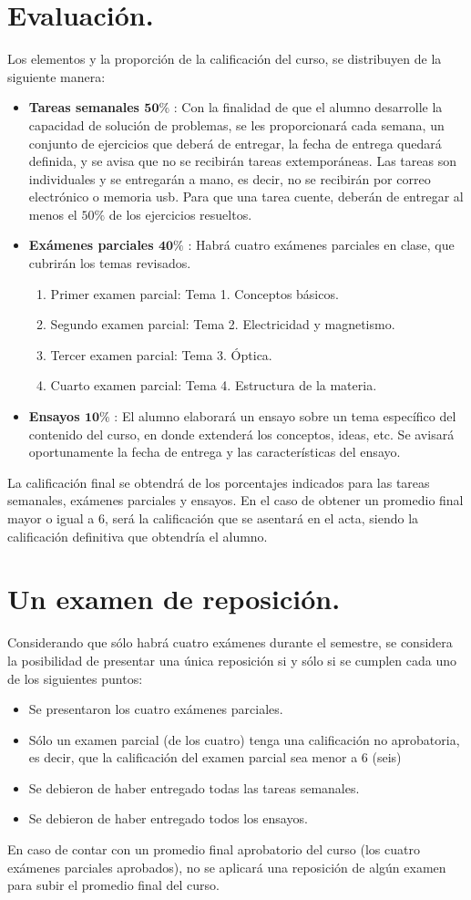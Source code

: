 \documentclass[12pt]{article}
\begin{document}
\section{Evaluación.}
Los elementos y la proporción de la calificación del curso, se distribuyen de la siguiente manera:
\begin{itemize}
\item \textbf{Tareas semanales $\mathbf{50\%}$} : Con la finalidad de que el alumno desarrolle la capacidad de solución de problemas, se les proporcionará cada semana, un conjunto de ejercicios que deberá de entregar, la fecha de entrega quedará definida, y se avisa que no se recibirán tareas extemporáneas. Las tareas son individuales y se entregarán a mano, es decir, no se recibirán por correo electrónico o memoria usb. Para que una tarea cuente, deberán de entregar al menos el $50\%$ de los ejercicios resueltos. 
\item \textbf{Exámenes parciales $\mathbf{40\%}$} : Habrá cuatro exámenes parciales en clase, que cubrirán los temas revisados.
\begin{enumerate}
\item Primer examen parcial: Tema 1. Conceptos básicos.
\item Segundo examen parcial: Tema 2. Electricidad y magnetismo.
\item Tercer examen parcial: Tema 3. Óptica.
\item Cuarto examen parcial: Tema 4. Estructura de la materia. 
\end{enumerate}
\item \textbf{Ensayos $\mathbf{10\%}$} : El alumno elaborará un ensayo sobre un tema específico del contenido del curso, en donde extenderá los conceptos, ideas, etc. Se avisará oportunamente la fecha de entrega y las características del ensayo.
\end{itemize}
La calificación final se obtendrá de los porcentajes indicados para las tareas semanales, exámenes parciales y ensayos. En el caso de obtener un promedio final mayor o igual a $6$, será la calificación que se asentará en el acta, siendo la calificación definitiva que obtendría el alumno.
\section{Un examen de reposición.}
Considerando que sólo habrá cuatro exámenes durante el semestre, se considera la posibilidad de presentar una única reposición si y sólo si se cumplen cada uno de los siguientes puntos:
\begin{itemize}
\item Se presentaron los cuatro exámenes parciales.
\item Sólo un examen parcial (de los cuatro) tenga una calificación no aprobatoria, es decir, que la calificación del examen parcial sea menor a $6$ (seis)
\item Se debieron de haber entregado todas las tareas semanales.
\item Se debieron de haber entregado todos los ensayos.
\end{itemize}
En caso de contar con un promedio final aprobatorio del curso (los cuatro exámenes parciales aprobados), no se aplicará una reposición de algún examen para subir el promedio final del curso.
\end{document}

